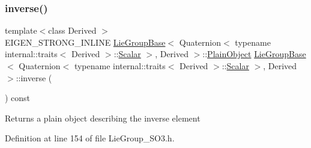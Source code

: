 \subsubsection{\texorpdfstring{inverse()}{inverse()}}
{\footnotesize\ttfamily template$<$class Derived $>$ \\
E\+I\+G\+E\+N\+\_\+\+S\+T\+R\+O\+N\+G\+\_\+\+I\+N\+L\+I\+NE \hyperlink{class_lie_group_base}{Lie\+Group\+Base}$<$ Quaternion$<$ typename internal\+::traits$<$ Derived $>$\+::\hyperlink{class_lie_group_base_3_01_quaternion_3_01typename_01internal_1_1traits_3_01_derived_01_4_1_1_scalar_01_4_00_01_derived_01_4_afadeceb3b98e52deecc572e71efb82a8}{Scalar} $>$, Derived $>$\+::\hyperlink{class_lie_group_base_3_01_quaternion_3_01typename_01internal_1_1traits_3_01_derived_01_4_1_1_scalar_01_4_00_01_derived_01_4_aadda973938291d3ccd25e606c6333a27}{Plain\+Object} \hyperlink{class_lie_group_base}{Lie\+Group\+Base}$<$ Quaternion$<$ typename internal\+::traits$<$ Derived $>$\+::\hyperlink{class_lie_group_base_3_01_quaternion_3_01typename_01internal_1_1traits_3_01_derived_01_4_1_1_scalar_01_4_00_01_derived_01_4_afadeceb3b98e52deecc572e71efb82a8}{Scalar} $>$, Derived $>$\+::inverse (\begin{DoxyParamCaption}{ }\end{DoxyParamCaption}) const}

\begin{DoxyReturn}{Returns}
a plain object describing the inverse element 
\end{DoxyReturn}


Definition at line 154 of file Lie\+Group\+\_\+\+S\+O3.\+h.

\hypertarget{class_lie_group_base_3_01_quaternion_3_01typename_01internal_1_1traits_3_01_derived_01_4_1_1_scalar_01_4_00_01_derived_01_4_a4f20af272eaf98644cb39a3f8976f75d}{}\label{class_lie_group_base_3_01_quaternion_3_01typename_01internal_1_1traits_3_01_derived_01_4_1_1_scalar_01_4_00_01_derived_01_4_a4f20af272eaf98644cb39a3f8976f75d} 
